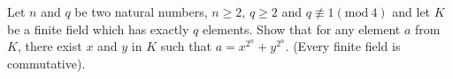 Let $n$ and $q$ be two natural numbers, $n\ge 2$, $q\ge 2$ and $q\not\equiv 1 (\text{mod}\ 4)$ and let $K$ be a finite field which has exactly $q$ elements. Show that for any element $a$ from $K$, there exist $x$ and $y$ in $K$ such that $a = x^{2^n} + y^{2^n}$. (Every finite field is commutative).